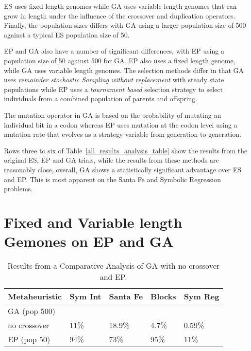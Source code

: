 ES uses fixed length genomes while GA uses variable length genomes that can grow in length under the influence of the crossover and duplication operators. Finally, the population sizes differs with GA using a larger population size of 500 against a typical ES population size of 50.

EP and GA also have a number of significant differences, with EP using  a population size of 50 against 500 for GA. EP also uses a fixed length genome, while GA uses variable length genomes. The selection methods differ in that GA uses \emph{remainder stochastic Sampling without replacement} with steady state populations while EP uses a \emph{tournament based} selection strategy to select individuals from a combined population of parents and offspring.

The mutation operator in GA is based on the probability of mutating an individual bit in a codon whereas EP uses mutation at the codon level using a mutation rate that evolves as a strategy variable from generation to generation. 

Rows three to six of Table~\ref{all_results_analysis_table} show the results from the original ES, EP and GA trials, while the results from these methods are reasonably close, overall, GA shows a statistically significant advantage over ES and EP. This is most apparent on the Santa Fe and Symbolic Regression problems.




\section{Fixed and Variable length Gemones on EP and GA}

\begin{table}[h]
\begin{center}
\begin{tabular}{|l|l|l|l|l|}
\hline
Metaheuristic          & Sym Int      & Santa Fe       & Blocks         & Sym Reg \\
\hline
GA (pop 500)           &              &                &                &                \\
no crossover           & 11\%         & 18.9\%         & 4.7\%          & 0.59\%         \\
EP (pop 50)            & 94\%         & 73\%           & 95\%           & 11\%           \\
\hline
\end{tabular}
\caption{\label{ep_ga} Results from a Comparative Analysis of GA with no crossover and EP.}
\end{center}
\end{table} 

